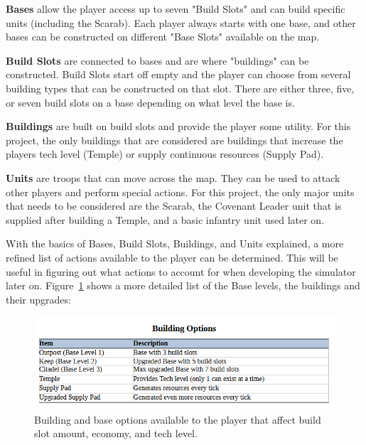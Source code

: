 \documentclass[a4paper, 12pt, english]{article}
\begin{document}
\textbf{Bases} allow the player access up to seven "Build Slots" and can build specific units (including the Scarab). Each player always starts with one base, and other bases can be constructed on different "Base Slots" available on the map.
\newline

\textbf{Build Slots} are connected to bases and are where "buildings" can be constructed. Build Slots start off empty and the player can choose from several building types that can be constructed on that slot. There are either three, five, or seven build slots on a base depending on what level the base is.
\newline

\textbf{Buildings} are built on build slots and provide the player some utility. For this project, the only buildings that are considered are buildings that increase the players tech level (Temple) or supply continuous resources (Supply Pad).
\newline

\textbf{Units} are troops that can move across the map. They can be used to attack other players and perform special actions. For this project, the only major units that needs to be considered are the Scarab, the Covenant Leader unit that is supplied after building a Temple, and a basic infantry unit used later on. 
\newline

With the basics of Bases, Build Slots, Buildings, and Units explained, a more refined list of actions available to the player can be determined. This will be useful in figuring out what actions to account for when developing the simulator later on. Figure~\ref{fig:BuildOptions} shows a more detailed list of the Base levels, the buildings and their upgrades: 

 \begin{figure}[!ht]
 			\begin{center}
				\includegraphics[width=125mm,scale=1.0]{BuildingOptionsChart.png}
			\end{center}
       		\caption{\label{fig:BuildOptions}Building and base options available to the player that affect build slot amount, economy, and tech level.}
 \end{figure}
\end{document}
